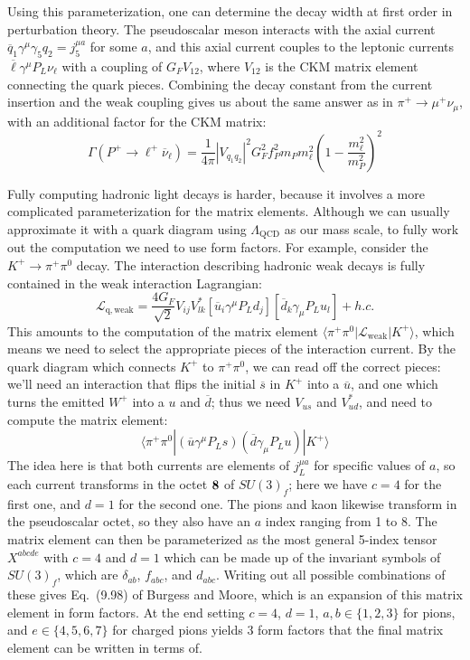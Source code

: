 \documentclass[11pt, oneside]{article}   	%
\theoremstyle{definition}
\numberwithin{equation}{subsection}		%
\begin{document}
Using this parameterization, one can determine the decay width at first order in perturbation theory. The pseudoscalar meson interacts with the 
axial current $\overline q_1\gamma^\mu\gamma_5 q_2 = j_5^{\mu a}$ for some $a$, and this axial current couples to the leptonic currents 
$\overline\ell \gamma^\mu P_L \nu_\ell$ with a coupling of $G_F V_{12}$, where $V_{12}$ is the CKM matrix element connecting the quark 
pieces. Combining the decay constant from the current insertion and the weak coupling gives us about the same answer as in $\pi^+\rightarrow 
\mu^+\nu_\mu$, with an additional factor for the CKM matrix:
\begin{equation}
	\Gamma(P^+\rightarrow\ell^+\overline\nu_\ell) = \frac{1}{4\pi} |V_{q_1 q_2}|^2 G_F^2 f_P^2 m_P m_\ell^2 \left(1 - \frac{m_\ell^2}{m_P^2}\right)^2
\end{equation}

Fully computing hadronic light decays is harder, because it involves a more complicated parameterization for the matrix elements. Although we 
can usually approximate it with a quark diagram using $\Lambda_\mathrm{QCD}$ as our mass scale, to fully work out the computation we need 
to use form factors. For example, consider the $K^+\rightarrow\pi^+ \pi^0$ decay. The interaction describing hadronic weak decays is fully 
contained in the weak interaction Lagrangian:
\begin{equation}
	\mathcal L_\mathrm{q, weak} = \frac{4 G_F}{\sqrt 2} V_{ij} V_{lk}^* [\overline u_i \gamma^\mu P_L d_j] [\overline d_k \gamma_\mu P_L u_l] + h.c.
\end{equation}
This amounts to the computation of the matrix element $\langle\pi^+\pi^0 | \mathcal L_\mathrm{weak} | K^+\rangle$, which means we need to select 
the appropriate pieces of the interaction current. By the quark diagram which connects $K^+$ to $\pi^+ \pi^0$, we can read off the correct pieces: 
we'll need an interaction that flips the initial $\overline s$ in $K^+$ into a $\overline u$, and one which turns the emitted $W^+$ into a $u$ and $\overline d$; 
thus we need $V_{us}$ and $V_{ud}^*$, and need to compute the matrix element:
\begin{equation}
	\langle\pi^+\pi^0 | (\overline u \gamma^\mu P_L s)(\overline d\gamma_\mu P_L u) | K^+\rangle
\end{equation}
The idea here is that both currents are elements of $j_L^{\mu a}$ for specific values of $a$, so each current transforms in the octet $\bf 8$ of 
$SU(3)_f$; here we have $c = 4$ for the first one, and $d = 1$ for the second one. The pions and kaon likewise transform in the pseudoscalar 
octet, so they also have an $a$ index ranging from 1 to 8. The matrix element can then be parameterized as the most general 5-index tensor $X^{abcde}$ 
with $c = 4$ and $d = 1$ which can be made up of the invariant symbols of $SU(3)_f$, which are $\delta_{ab}$, $f_{abc}$, and $d_{abc}$. 
Writing out all possible combinations of these gives Eq.~(9.98) of Burgess and Moore, which is an expansion of this matrix element in form 
factors. At the end setting $c = 4$, $d = 1$, $a, b\in\{1, 2, 3\}$ for pions, and $e\in \{4, 5, 6, 7\}$ for charged pions yields 3 form factors that 
the final matrix element can be written in terms of.
\end{document}
